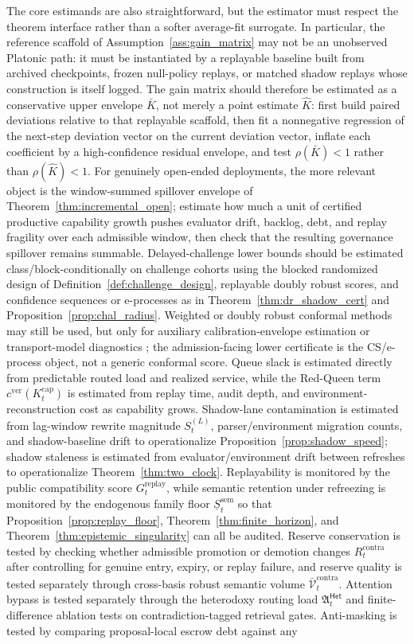 \documentclass[11pt]{article}
\theoremstyle{definition}
\newcommand{\1}{\mathbf{1}}
\newcommand{\Het}{\mathsf{Het}}
\begin{document}
The core estimands are also straightforward, but the estimator must respect the theorem interface rather than a softer average-fit surrogate. In particular, the reference scaffold of Assumption~\ref{ass:gain_matrix} may not be an unobserved Platonic path: it must be instantiated by a replayable baseline built from archived checkpoints, frozen null-policy replays, or matched shadow replays whose construction is itself logged. The gain matrix should therefore be estimated as a conservative upper envelope $\bar K$, not merely a point estimate $\hat K$: first build paired deviations relative to that replayable scaffold, then fit a nonnegative regression of the next-step deviation vector on the current deviation vector, inflate each coefficient by a high-confidence residual envelope, and test $\rho(\bar K)<1$ rather than $\rho(\hat K)<1$. For genuinely open-ended deployments, the more relevant object is the window-summed spillover envelope of Theorem~\ref{thm:incremental_open}; estimate how much a unit of certified productive capability growth pushes evaluator drift, backlog, debt, and replay fragility over each admissible window, then check that the resulting governance spillover remains summable. Delayed-challenge lower bounds should be estimated class/block-conditionally on challenge cohorts using the blocked randomized design of Definition~\ref{def:challenge_design}, replayable doubly robust scores, and confidence sequences or e-processes as in Theorem~\ref{thm:dr_shadow_cert} and Proposition~\ref{prop:chal_radius}. Weighted or doubly robust conformal methods may still be used, but only for auxiliary calibration-envelope estimation or transport-model diagnostics \cite{Tibshirani2019,Yang2024,Jonkers2024,JinCandes2026}; the admission-facing lower certificate is the CS/e-process object, not a generic conformal score. Queue slack is estimated directly from predictable routed load and realized service, while the Red-Queen term $c^{\mathrm{ver}}(K_t^{\mathrm{cap}})$ is estimated from replay time, audit depth, and environment-reconstruction cost as capability grows. Shadow-lane contamination is estimated from lag-window rewrite magnitude $S_t^{(L)}$, parser/environment migration counts, and shadow-baseline drift to operationalize Proposition~\ref{prop:shadow_speed}; shadow staleness is estimated from evaluator/environment drift between refreshes to operationalize Theorem~\ref{thm:two_clock}. Replayability is monitored by the public compatibility score $G_t^{\mathrm{replay}}$, while semantic retention under refreezing is monitored by the endogenous family floor $\underline S_t^{\mathrm{sem}}$ so that Proposition~\ref{prop:replay_floor}, Theorem~\ref{thm:finite_horizon}, and Theorem~\ref{thm:epistemic_singularity} can all be audited. Reserve conservation is tested by checking whether admissible promotion or demotion changes $R_t^{\mathrm{contra}}$ after controlling for genuine entry, expiry, or replay failure, and reserve quality is tested separately through cross-basis robust semantic volume $\bar{\mathcal V}_t^{\mathrm{contra}}$. Attention bypass is tested separately through the heterodoxy routing load $\mathfrak A_t^{\Het}$ and finite-difference ablation tests on contradiction-tagged retrieval gates. Anti-masking is tested by comparing proposal-local escrow debt against any 
\end{document}
